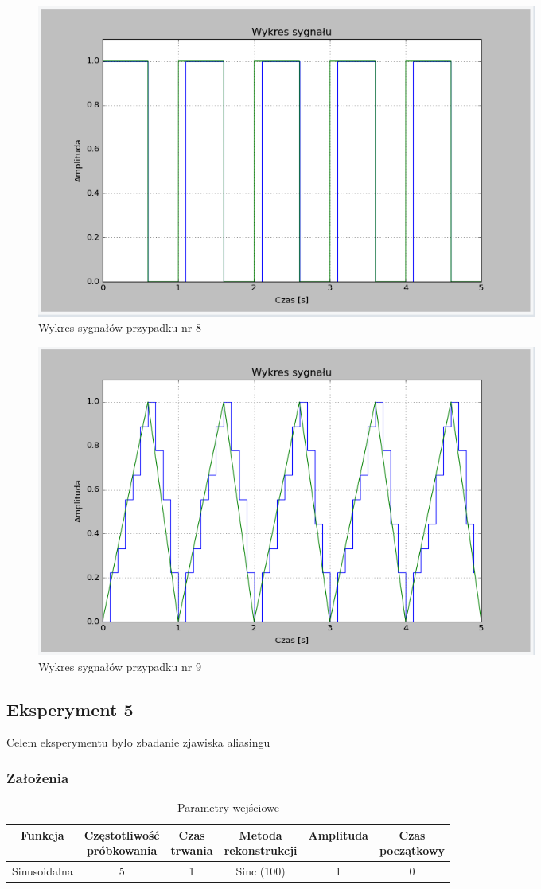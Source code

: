 \documentclass{article}
\begin{document}
    \begin{figure}[h!]
        \centering
        \includegraphics[width=0.8\textwidth]{img/1/quad_rect_2.png}
        \caption{Wykres sygnałów przypadku nr 8}
    \end{figure}
    \FloatBarrier

    \begin{figure}[h!]
        \centering
        \includegraphics[width=0.8\textwidth]{img/1/quad_tri_10.png}
        \caption{Wykres sygnałów przypadku nr 9}
    \end{figure}
    \FloatBarrier
    \subsection{Eksperyment 5}
    Celem eksperymentu było zbadanie zjawiska aliasingu

    \subsubsection{Założenia}
    \begin{table}[h!]
        \centering
        \begin{tabular}{|c|c|c|c|c|c|}
            \hline
            Funkcja & \shortstack{Częstotliwość\\ próbkowania} & \shortstack{Czas\\ trwania} & \shortstack{Metoda\\ rekonstrukcji} & Amplituda & \shortstack{Czas\\ początkowy}  \\ \hline
            Sinusoidalna & 5 & 1 & Sinc (100) & 1 & 0  \\ \hline
        \end{tabular}
        \caption{Parametry wejściowe}
    \end{table}
    
\end{document}
